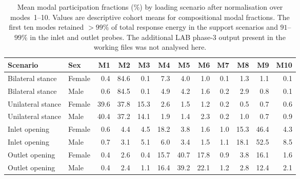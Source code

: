 \documentclass[openacc]{rsproca_new}
\begin{document}
\begin{table}[p]
\centering
\caption{Mean modal participation fractions (\%) by loading scenario after normalisation over modes~1--10. Values are descriptive cohort means for compositional modal fractions. The first ten modes retained $>99\%$ of total response energy in the support scenarios and $91$--$99\%$ in the inlet and outlet probes. The additional LAB phase-3 output present in the working files was not analysed here.}
\label{tab:loadcases}
\begin{tabular}{llrrrrrrrrrr}
\toprule
Scenario & Sex & M1 & M2 & M3 & M4 & M5 & M6 & M7 & M8 & M9 & M10 \\
\midrule
Bilateral stance & Female & 0.4 & 84.6 & 0.1 & 7.3 & 4.0 & 1.0 & 0.1 & 1.3 & 1.1 & 0.1 \\
Bilateral stance & Male   & 0.6 & 84.5 & 0.1 & 4.9 & 4.2 & 1.6 & 0.2 & 2.9 & 0.8 & 0.1 \\
Unilateral stance & Female & 39.6 & 37.8 & 15.3 & 2.6 & 1.5 & 1.2 & 0.2 & 0.5 & 0.7 & 0.6 \\
Unilateral stance & Male   & 40.4 & 37.2 & 14.1 & 1.9 & 1.4 & 2.3 & 0.2 & 1.0 & 0.7 & 0.9 \\
Inlet opening & Female & 0.6 & 4.4 & 4.5 & 18.2 & 3.8 & 1.6 & 1.0 & 15.3 & 46.4 & 4.3 \\
Inlet opening & Male   & 0.7 & 3.1 & 5.1 & 6.0 & 3.4 & 1.5 & 1.1 & 18.1 & 52.5 & 8.5 \\
Outlet opening & Female & 0.4 & 2.6 & 0.4 & 15.7 & 40.7 & 17.8 & 0.9 & 3.8 & 16.1 & 1.6 \\
Outlet opening & Male   & 0.4 & 2.4 & 1.1 & 16.4 & 39.2 & 22.1 & 1.2 & 2.8 & 12.4 & 2.1 \\
\bottomrule
\end{tabular}
\end{table}
\end{document}
